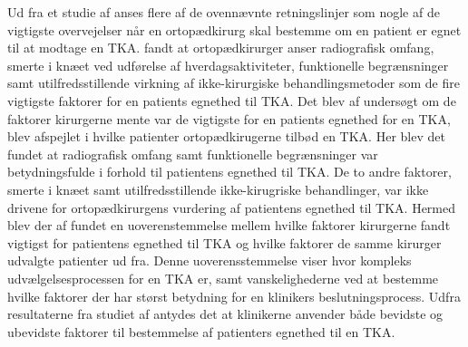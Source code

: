 Ud fra et studie af \cite{skou2016} anses flere af de ovennævnte retningslinjer som nogle af de vigtigste overvejelser når en ortopædkirurg skal bestemme om en patient er egnet til at modtage en TKA. \cite{skou2016} fandt at ortopædkirurger anser radiografisk omfang, smerte i knæet ved udførelse af hverdagsaktiviteter, funktionelle begrænsninger samt utilfredsstillende virkning af ikke-kirurgiske behandlingsmetoder som de fire vigtigste faktorer for en patients egnethed til TKA. Det blev af \cite{skou2016} undersøgt om de faktorer kirurgerne mente var de vigtigste for en patients egnethed for en TKA, blev afspejlet i hvilke patienter ortopædkirugerne tilbød en TKA. Her blev det fundet at radiografisk omfang samt funktionelle begrænsninger var betydningsfulde i forhold til patientens egnethed til TKA. De to andre faktorer, smerte i knæet samt utilfredsstillende ikke-kirugriske behandlinger, var ikke drivene for ortopædkirurgens vurdering af patientens egnethed til TKA. Hermed blev der af \cite{skou2016} fundet en uoverenstemmelse mellem hvilke faktorer kirurgerne fandt vigtigst for patientens egnethed til TKA og hvilke faktorer de samme kirurger udvalgte patienter ud fra. Denne uoverensstemmelse viser hvor kompleks udvælgelsesprocessen for en TKA er, samt vanskelighederne ved at bestemme hvilke faktorer der har størst betydning for en klinikers beslutningsprocess. Udfra resultaterne fra studiet af \cite{skou2016} antydes det at klinikerne anvender både bevidste og ubevidste faktorer til bestemmelse af patienters egnethed til en TKA.    

